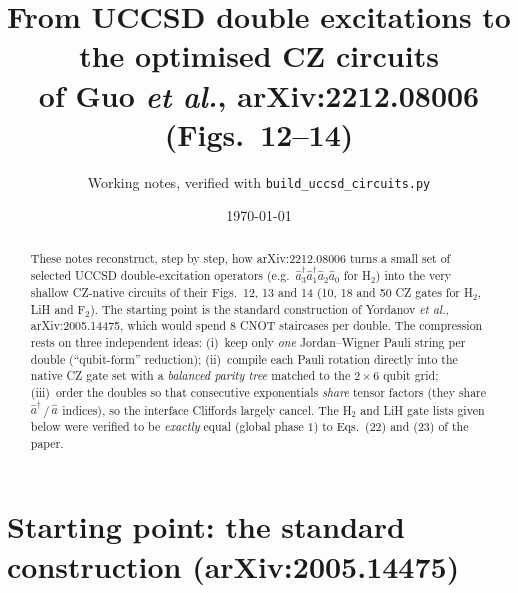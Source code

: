 \documentclass[11pt]{article}
\title{From UCCSD double excitations to the optimised CZ circuits\\
of Guo \emph{et al.}, arXiv:2212.08006 (Figs.~12--14)}
\author{Working notes, verified with \texttt{build\_uccsd\_circuits.py}}
\date{\today}
\newcommand{\ad}[1]{\hat{a}^{\dagger}_{#1}}
\newcommand{\an}[1]{\hat{a}_{#1}}
\begin{document}
\maketitle

\begin{abstract}
These notes reconstruct, step by step, how arXiv:2212.08006 turns a small set of
selected UCCSD double-excitation operators (e.g.\ $\ad{3}\ad{1}\an{2}\an{0}$ for
H$_2$) into the very shallow CZ-native circuits of their Figs.~12, 13 and 14
(10, 18 and 50 CZ gates for H$_2$, LiH and F$_2$).
The starting point is the standard construction of Yordanov \emph{et al.},
arXiv:2005.14475, which would spend $8$ CNOT staircases per double.
The compression rests on three independent ideas:
(i)~keep only \emph{one} Jordan--Wigner Pauli string per double
(``qubit-form'' reduction);
(ii)~compile each Pauli rotation directly into the native CZ gate set with a
\emph{balanced parity tree} matched to the $2\times 6$ qubit grid;
(iii)~order the doubles so that consecutive exponentials \emph{share}
tensor factors (they share $\ad{}\,$/$\,\an{}$ indices), so the interface
Cliffords largely cancel.
The H$_2$ and LiH gate lists given below were verified to be \emph{exactly}
equal (global phase $1$) to Eqs.~(22) and (23) of the paper.
\end{abstract}

\section{Starting point: the standard construction (arXiv:2005.14475)}
\end{document}
